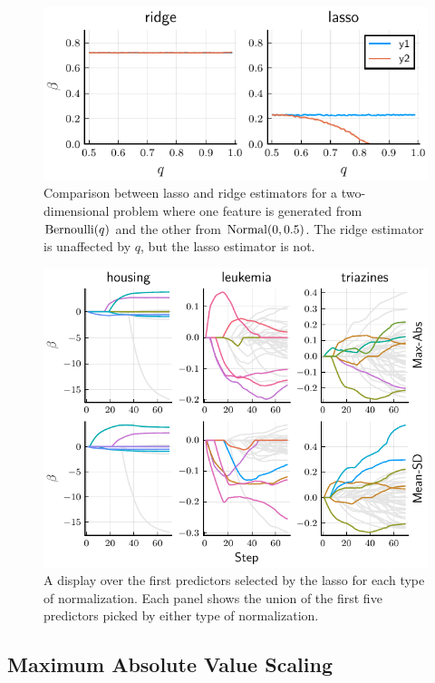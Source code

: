 \begin{figure}[htpb]
  \centering
  \includegraphics[]{plots/lasso_ridge_twodim.pdf}
  \caption{%
    Comparison between lasso and ridge estimators for a two-dimensional problem where one feature is generated from \(\operatorname{Bernoulli}(q)\) and the other from \(\operatorname{Normal}(0, 0.5)\). The ridge estimator is unaffected by \(q\), but the lasso estimator is not.
  }
  \label{fig:lasso-ridge-comparison}
\end{figure}

\begin{figure}[htpb]
  \centering
  \includegraphics[]{plots/realdata_paths.pdf}
  \caption{%
    A display over the first predictors selected by the lasso for each type of normalization. Each panel shows the union of the first five predictors picked by either type of normalization.
  }
  \label{fig:realdata-paths}
\end{figure}

\subsection{Maximum Absolute Value Scaling}

